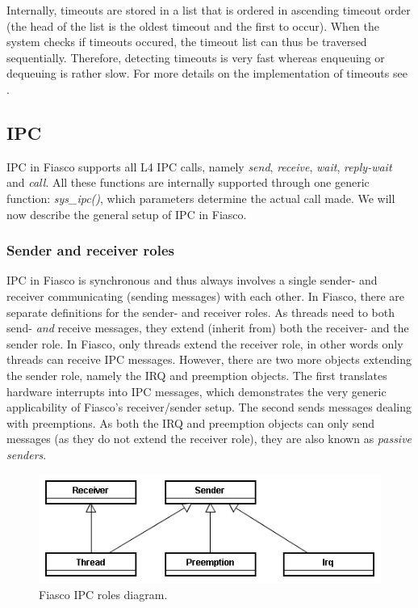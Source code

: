 Internally, timeouts are stored in a list that is ordered in ascending timeout order (the head of the list is the oldest timeout and the first to occur). When the system checks if timeouts occured, the timeout list can thus be traversed sequentially. Therefore, detecting timeouts is very fast whereas enqueuing or dequeuing is rather slow. For more details on the implementation of timeouts see \cite{reusner05impl}.

\subsection{IPC}
IPC in Fiasco supports all L4 IPC calls, namely \emph{send}, \emph{receive}, \emph{wait}, \emph{reply-wait} and \emph{call}. All these functions are internally supported through one generic function: \emph{sys\_ipc()}, which parameters determine the actual call made. We will now describe the general setup of IPC in Fiasco.

\subsubsection{Sender and receiver roles}
IPC in Fiasco is synchronous and thus always involves a single sender- and receiver communicating (sending messages) with each other. In Fiasco, there are separate definitions for the sender- and receiver roles. As threads need to both send- \textit{and} receive messages, they extend (inherit from) both the receiver- and the sender role. In Fiasco, only threads extend the receiver role, in other words only threads can receive IPC messages. However, there are two more objects extending the sender role, namely the IRQ and preemption objects. The first translates hardware interrupts into IPC messages, which demonstrates the very generic applicability of Fiasco's receiver/sender setup. The second sends messages dealing with preemptions. As both the IRQ and preemption objects can only send messages (as they do not extend the receiver role), they are also known as \emph{passive senders}.\emptyline

\begin{figure}[ht]
\includegraphics[scale=0.50]{images/diagrams/ipc_class_ipc_roles}
\caption{Fiasco IPC roles diagram.}
\end{figure}

